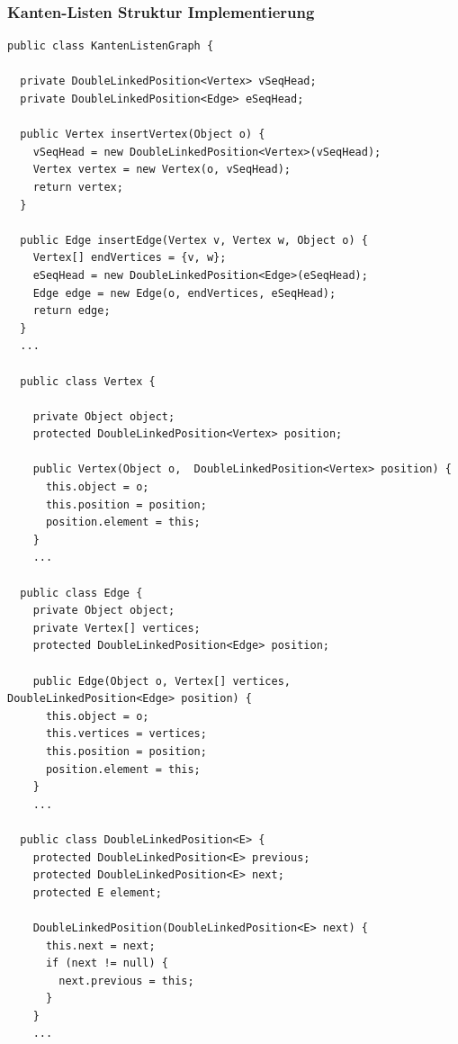 \subsubsection{Kanten-Listen Struktur Implementierung}
\begin{lstlisting}
public class KantenListenGraph { 

  private DoubleLinkedPosition<Vertex> vSeqHead; 
  private DoubleLinkedPosition<Edge> eSeqHead; 

  public Vertex insertVertex(Object o) { 
    vSeqHead = new DoubleLinkedPosition<Vertex>(vSeqHead); 
    Vertex vertex = new Vertex(o, vSeqHead); 
    return vertex; 
  } 

  public Edge insertEdge(Vertex v, Vertex w, Object o) { 
    Vertex[] endVertices = {v, w}; 
    eSeqHead = new DoubleLinkedPosition<Edge>(eSeqHead); 
    Edge edge = new Edge(o, endVertices, eSeqHead); 
    return edge; 
  } 
  ... 

  public class Vertex { 

    private Object object; 
    protected DoubleLinkedPosition<Vertex> position; 
    
    public Vertex(Object o,  DoubleLinkedPosition<Vertex> position) { 
      this.object = o; 
      this.position = position; 
      position.element = this; 
    }   
    ... 

  public class Edge { 
    private Object object; 
    private Vertex[] vertices; 
    protected DoubleLinkedPosition<Edge> position; 
    
    public Edge(Object o, Vertex[] vertices, DoubleLinkedPosition<Edge> position) { 
      this.object = o; 
      this.vertices = vertices; 
      this.position = position; 
      position.element = this; 
    } 
    ... 

  public class DoubleLinkedPosition<E> { 
    protected DoubleLinkedPosition<E> previous; 
    protected DoubleLinkedPosition<E> next; 
    protected E element; 

    DoubleLinkedPosition(DoubleLinkedPosition<E> next) { 
      this.next = next;
      if (next != null) { 
        next.previous = this; 
      } 
    } 
    ... 
\end{lstlisting}

